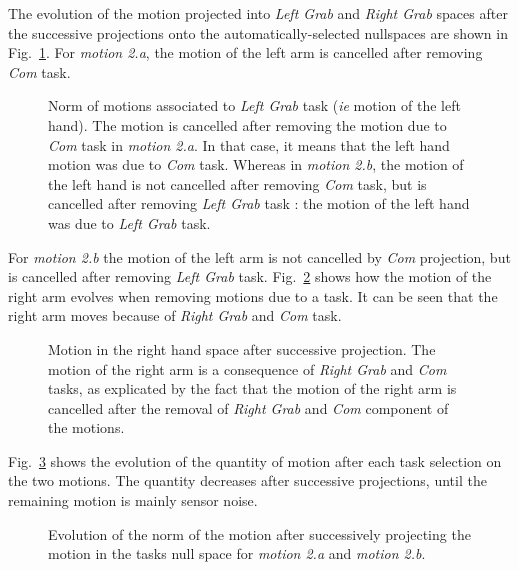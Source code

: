 \documentclass[journal]{IEEEtran}
\begin{document}
The evolution of the motion projected into \emph{Left Grab} and \emph{Right Grab}
spaces after the successive projections onto the automatically-selected nullspaces
are shown in Fig.~\ref{fig:exp1:Evolution2L}. For \emph{motion 2.a},
the motion of the left arm is cancelled after removing \emph{Com} task.
\begin{figure}[hp]
  \centering
  \subfigure[Motion 2.a]{
  \resizebox{.48\textwidth}{!} {
  
  }                           
  \label{fig:exp1:Evolution2L:a}
  }
  \subfigure[Motion 2.b]{
  \resizebox{.48\textwidth}{!} {
  
  }
  \label{fig:exp1:Evolution2L:b}
  }
  \caption{Norm of motions associated to \emph{Left Grab} task (\emph{ie} motion of the left hand).
  The motion is cancelled after removing the motion due to \emph{Com} task
  in \emph{motion 2.a}. In that case, it means that the left hand motion was due to \emph{Com} task.
  Whereas in \emph{motion 2.b}, the motion of the left hand is not cancelled after
  removing \emph{Com} task, but is cancelled after removing
  \emph{Left Grab} task : the motion of the left hand was due
  to \emph{Left Grab} task.}
  \label{fig:exp1:Evolution2L}
\end{figure}
For \emph{motion 2.b} the motion of the left arm is
not cancelled by \emph{Com} projection, but is cancelled after
removing \emph{Left Grab} task.
Fig.~\ref{fig:exp1:Evolution2R} shows how the motion of the right arm evolves when removing
motions due to a task. It can be seen that the right arm moves because of \emph{Right Grab} and
\emph{Com} task.
\begin{figure}[p]
  \centering
  \subfigure[Motion 2.a]{
  \resizebox{.48\textwidth}{!} {
  
  }                           
  \label{fig:exp1:Evolution2R:a}
  }
  \subfigure[Motion 2.b]{
  \resizebox{.48\textwidth}{!} {
  
  }
  \label{fig:exp1:Evolution2R:b}
  }
  \caption{Motion in the right hand space after successive projection.
  The motion of the right arm is a consequence of 
  \emph{Right Grab} and \emph{Com} tasks, as explicated by the fact
  that the motion of the right arm is cancelled
  after the removal of \emph{Right Grab} and \emph{Com} component of the motions.}
  \label{fig:exp1:Evolution2R}
\end{figure}
Fig.~\ref{fig:exp1:PqdotNorms} shows the evolution of the quantity of motion after each task selection
on the two motions. The quantity decreases after successive projections, until the remaining motion 
is mainly sensor noise.
\begin{figure}[p]
  \centering
  \subfigure[Motion 2.a]{
  \resizebox{.48\textwidth}{!} {
    
  }
  \label{fig:exp1:PqdotNormsR}
  }
  \subfigure[Motion 2.b]{
  \resizebox{.48\textwidth}{!} {
    
  }
\label{fig:exp1:PqdotNormsRL}
}
\caption{Evolution of the norm of the motion after successively projecting the motion in the tasks null space for
\emph{motion 2.a} and \emph{motion 2.b}.}
\label{fig:exp1:PqdotNorms}
\end{figure}
\end{document}
